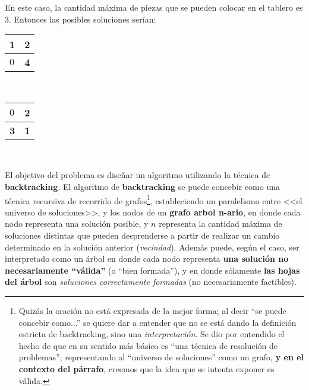 \documentclass[11pt, a4paper, twoside]{article}
\begin{document}
\begin{ejemplo}
  En este caso, la cantidad máxima de piezas que se pueden colocar en el tablero es $3$. Entonces las posibles soluciones serían:
  
  \begin{center}
    \begin{minipage}{0.5\textwidth}
        \centering
        \begin{tabular}{ | l | l |}
            \hline 
            \textbf{1}  & \textbf{2} \\ 
            \hline 
            $0$  & \textbf{4} \\ 
            \hline
        \end{tabular}  \\
    \end{minipage}
    \begin{minipage}{0.5\textwidth}
        \begin{tabular}{ | l | l |}
            \hline 
            $0$     & \textbf{2} \\ 
            \hline 
            \textbf{3}  & \textbf{1} \\ 
            \hline
        \end{tabular} \\
    \end{minipage}
  \end{center}
\end{ejemplo}


El objetivo del problema es diseñar un algoritmo utilizando la técnica de
\textbf{backtracking}. El algoritmo de \textbf{backtracking} se puede concebir
como una técnica recursiva de recorrido de grafos\footnote{Quizás la oración no
está expresada de la mejor forma; al decir ``se puede concebir como...'' se
quiere dar a entender que no se está dando la definición estricta de
backtracking, sino una \emph{interpretación}. Se dio por entendido el hecho de
que en su sentido más básico es ``una técnica de resolución de problemas'';
representando al ``universo de soluciones'' como un grafo, \textbf{y en el
contexto del párrafo}, creemos que la idea que se intenta exponer es válida.},
estableciendo un paralelismo entre <<el universo de soluciones>>, y los nodos de
un \textbf{grafo arbol n-ario}, en donde cada nodo representa una solución
posible, y $n$ representa la cantidad máxima de soluciones distintas que pueden
desprenderse a partir de realizar un cambio determinado en la solución anterior
(\emph{vecindad}). Además puede, según el caso, ser interpretado como un árbol
en donde cada nodo representa \textbf{una solución no necesariamente ``válida''}
(o ``bien formada''), y en donde sólamente \textbf{las hojas del árbol} son
\emph{soluciones correctamente formadas} (no necesariamente factibles).
\end{document}
